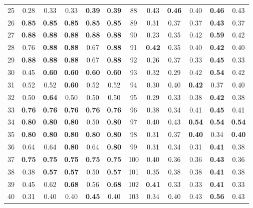 \documentclass{article}
\begin{document}
{\begin{longtable}{cccccc@{\qquad}cccccc}
25 & 0.28 & 0.33 & 0.33 & \textbf{0.39} & \textbf{0.39} & 88 & 0.43 & \textbf{0.46} & 0.40 & \textbf{0.46} & 0.43 \\
26 & \textbf{0.85} & \textbf{0.85} & \textbf{0.85} & \textbf{0.85} & \textbf{0.85} & 89 & 0.31 & 0.37 & 0.37 & \textbf{0.43} & 0.37 \\
27 & \textbf{0.88} & \textbf{0.88} & \textbf{0.88} & \textbf{0.88} & \textbf{0.88} & 90 & 0.23 & 0.35 & 0.42 & \textbf{0.59} & 0.42 \\
28 & 0.76 & \textbf{0.88} & \textbf{0.88} & 0.67 & \textbf{0.88} & 91 & \textbf{0.42} & 0.35 & 0.40 & \textbf{0.42} & 0.40 \\
29 & \textbf{0.88} & \textbf{0.88} & \textbf{0.88} & 0.67 & \textbf{0.88} & 92 & 0.26 & 0.37 & 0.33 & \textbf{0.45} & 0.33 \\
30 & 0.45 & \textbf{0.60} & \textbf{0.60} & \textbf{0.60} & \textbf{0.60} & 93 & 0.32 & 0.29 & 0.42 & \textbf{0.54} & 0.42 \\
31 & 0.52 & 0.52 & \textbf{0.60} & 0.52 & 0.52 & 94 & 0.30 & 0.40 & \textbf{0.42} & 0.37 & 0.40 \\
32 & 0.50 & \textbf{0.64} & 0.50 & 0.50 & 0.50 & 95 & 0.29 & 0.33 & 0.38 & \textbf{0.42} & 0.38 \\
33 & \textbf{0.76} & \textbf{0.76} & \textbf{0.76} & \textbf{0.76} & \textbf{0.76} & 96 & 0.38 & 0.34 & 0.41 & \textbf{0.45} & 0.41 \\
34 & \textbf{0.80} & \textbf{0.80} & \textbf{0.80} & 0.50 & \textbf{0.80} & 97 & 0.40 & 0.43 & \textbf{0.54} & \textbf{0.54} & \textbf{0.54} \\
35 & \textbf{0.80} & \textbf{0.80} & \textbf{0.80} & \textbf{0.80} & \textbf{0.80} & 98 & 0.31 & 0.37 & \textbf{0.40} & 0.34 & \textbf{0.40} \\
36 & 0.64 & 0.64 & \textbf{0.80} & 0.64 & \textbf{0.80} & 99 & 0.31 & 0.34 & 0.31 & \textbf{0.41} & 0.38 \\
37 & \textbf{0.75} & \textbf{0.75} & \textbf{0.75} & \textbf{0.75} & \textbf{0.75} & 100 & 0.40 & 0.36 & 0.36 & \textbf{0.43} & 0.36 \\
38 & 0.38 & \textbf{0.57} & \textbf{0.57} & 0.50 & \textbf{0.57} & 101 & 0.35 & 0.38 & 0.38 & \textbf{0.41} & 0.38 \\
39 & 0.45 & 0.62 & \textbf{0.68} & 0.56 & \textbf{0.68} & 102 & \textbf{0.41} & 0.33 & 0.33 & \textbf{0.41} & 0.33 \\
40 & 0.31 & 0.40 & 0.40 & \textbf{0.45} & 0.40 & 103 & 0.34 & 0.40 & 0.43 & \textbf{0.56} & 0.43 \\

\end{longtable}}
\end{document}
